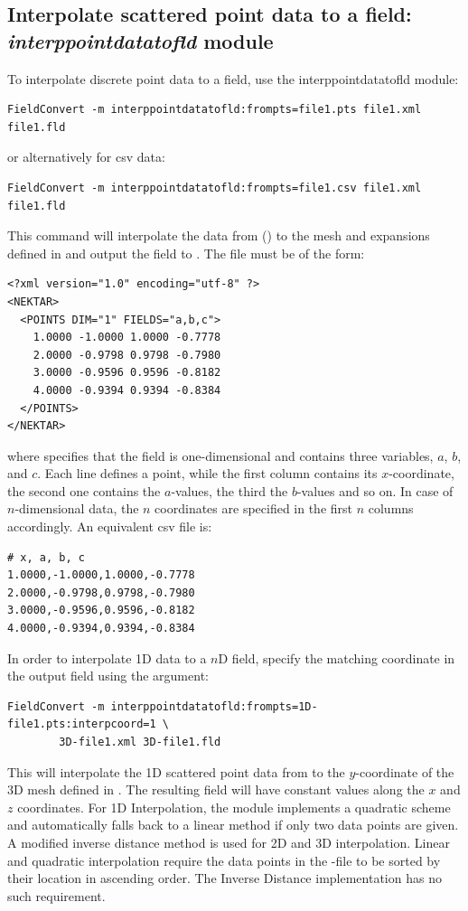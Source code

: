 \subsection{Interpolate scattered point data to a field: \textit{interppointdatatofld} module}
\label{s:utilities:fieldconvert:sub:interppointdatatofld}
To interpolate discrete point data to a field, use the interppointdatatofld module:
%
\begin{lstlisting}[style=BashInputStyle]
FieldConvert -m interppointdatatofld:frompts=file1.pts file1.xml file1.fld
\end{lstlisting}
or alternatively for csv data:
 \begin{lstlisting}[style=BashInputStyle]
FieldConvert -m interppointdatatofld:frompts=file1.csv file1.xml file1.fld
\end{lstlisting}
%
This command will interpolate the data from  () to the mesh
and expansions defined in  and output the field to .
The file  must be of the form:
%
\begin{lstlisting}[style=XMLStyle]
<?xml version="1.0" encoding="utf-8" ?>
<NEKTAR>
  <POINTS DIM="1" FIELDS="a,b,c">
    1.0000 -1.0000 1.0000 -0.7778
    2.0000 -0.9798 0.9798 -0.7980
    3.0000 -0.9596 0.9596 -0.8182
    4.0000 -0.9394 0.9394 -0.8384
  </POINTS>
</NEKTAR>
\end{lstlisting}
%
where  specifies that the field is one-dimensional
and contains three variables, $a$, $b$, and $c$.
Each line defines a point, while the  first column contains its $x$-coordinate,
the second one contains the $a$-values, the third the $b$-values and so on.
In case of $n$-dimensional data, the $n$ coordinates are specified in the first $n$
columns accordingly.
%
An equivalent csv file is:
\begin{lstlisting}[style=BashInputStyle]
# x, a, b, c
1.0000,-1.0000,1.0000,-0.7778
2.0000,-0.9798,0.9798,-0.7980
3.0000,-0.9596,0.9596,-0.8182
4.0000,-0.9394,0.9394,-0.8384
\end{lstlisting}
%
In order to interpolate 1D data to a $n$D field, specify the matching coordinate in
the output field using the  argument:
%
\begin{lstlisting}[style=BashInputStyle]
FieldConvert -m interppointdatatofld:frompts=1D-file1.pts:interpcoord=1 \
        3D-file1.xml 3D-file1.fld
\end{lstlisting}
%
This will interpolate the 1D scattered point data from  to the
$y$-coordinate of the 3D mesh defined in \inltt{3D-file1.xml}. The resulting field
will have constant values along the $x$ and $z$ coordinates.
For 1D Interpolation, the module implements a quadratic scheme and automatically
falls back to a linear method if only two data points are given.
A modified inverse distance method is used for 2D and 3D interpolation.
Linear and quadratic interpolation require the data points in the -file to be
sorted by their location in ascending order.
The Inverse Distance implementation has no such requirement.
%
%
%
